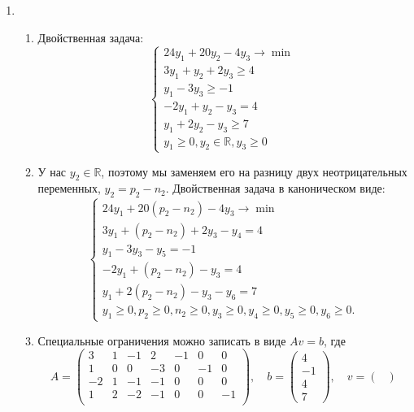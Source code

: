 \documentclass[12pt]{article}
\newcommand \RR{\mathbb{R}}
\begin{document}
\begin{enumerate}
    \item 
    \begin{enumerate}
      \item  Двойственная задача:
      \[
      \begin{cases}
          24y_1 + 20y_2 -4 y_3 \to \min \\
          3y_1 + y_2 +2 y_3 \geq 4 \\
          y_1 -3y_3 \geq -1 \\
          -2y_1 + y_2 -y_3 = 4 \\
          y_1 + 2y_2 - y_3 \geq 7 \\
          y_1 \geq 0, y_2 \in \RR, y_3 \geq 0 
      \end{cases}
      \]
      \item У нас $y_2 \in \RR$, поэтому мы заменяем его на разницу двух неотрицательных переменных, $y_2 = p_2 - n_2$.
      Двойственная задача в каноническом виде:
      \[
      \begin{cases}
          24y_1 + 20(p_2 - n_2) -4 y_3 \to \min \\
          3y_1 + (p_2 - n_2) +2 y_3 - y_4 = 4 \\
          y_1 -3y_3 - y_5 = -1 \\
          -2y_1 + (p_2 - n_2) -y_3 = 4 \\
          y_1 + 2(p_2 - n_2) - y_3 - y_6 = 7 \\
          y_1 \geq 0, p_2 \geq 0, n_2 \geq 0, y_3 \geq 0, y_4 \geq 0, y_5 \geq 0, y_6 \geq 0.
      \end{cases}
      \]
      \item Специальные ограничения можно записать в виде $A v = b$, 
      где 
      \[
      A = \begin{pmatrix}
        3 & 1 & -1 & 2 & -1 & 0 & 0 \\
        1 & 0 & 0  & -3 & 0 & -1 & 0 \\
        -2 & 1 & -1 & -1 & 0 & 0 & 0 \\
        1 & 2 & -2 & -1 & 0 & 0 & -1 \\
      \end{pmatrix}, \quad
      b = \begin{pmatrix}
        4\\
        -1 \\
        4 \\
        7
      \end{pmatrix}, \quad 
      v = \begin{pmatrix}

\end{pmatrix}\]
\end{enumerate}
\end{enumerate}
\end{document}
